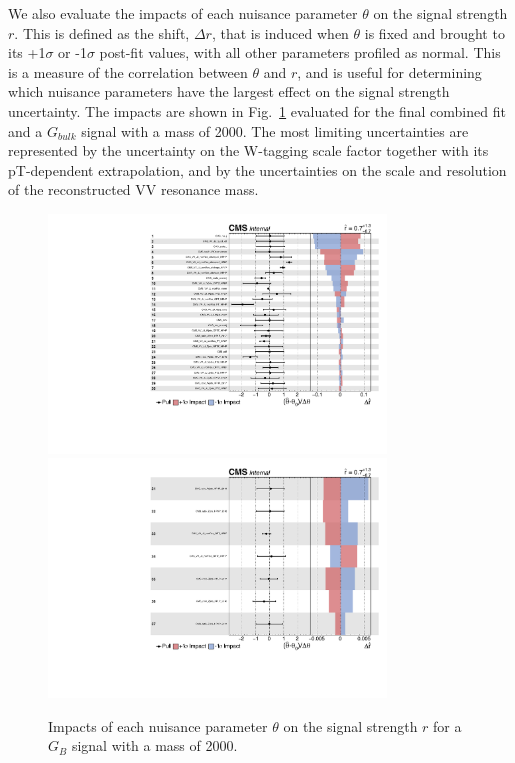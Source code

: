 We also evaluate the impacts of each nuisance parameter $\theta$ on the signal strength $r$. This is defined as the shift, $\Delta r$, that is induced when $\theta$ is fixed and brought to its +1$\sigma$ or -1$\sigma$ post-fit values, with all other parameters profiled as normal.
This is a measure of the correlation between $\theta$ and $r$, and is useful for determining which nuisance parameters have the largest effect on the signal strength uncertainty. The impacts are shown in Fig.~\ref{fig:impacts} evaluated for the final combined fit and a $G_{bulk}$ signal with a mass of 2000\GeV.
The most limiting uncertainties are represented by the uncertainty on the W-tagging scale factor together with its pT-dependent extrapolation, and by the uncertainties on the scale and resolution of the reconstructed VV resonance mass.
\begin{figure}[h!]
\centering
\includegraphics[width=0.8\textwidth]{figures/analysis/search3/AN-17-303/postfitchecks/impacts_1.pdf}\\
\includegraphics[width=0.8\textwidth]{figures/analysis/search3/AN-17-303/postfitchecks/impacts_2.pdf}
\caption{Impacts of each nuisance parameter $\theta$ on the signal strength $r$ for a $G_{B}$ signal with a mass of 2000\GeV.}
\label{fig:impacts}
\end{figure}
\clearpage

